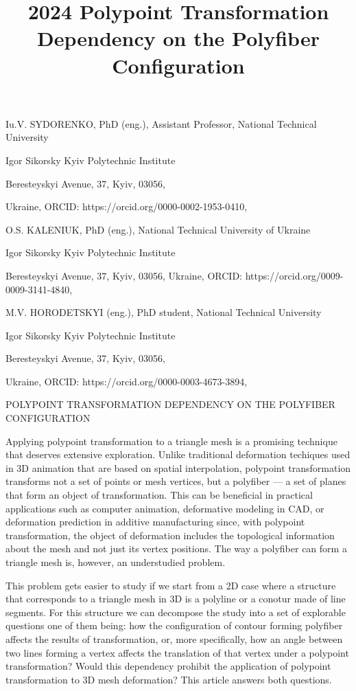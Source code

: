 \documentclass[12pt,a4paper]{article}
\begin{document}
\title{2024 Polypoint Transformation Dependency on the Polyfiber Configuration}
\maketitle
Iu.V. SYDORENKO, PhD (eng.), Assistant Professor, National Technical University
\par
Igor Sikorsky Kyiv Polytechnic Institute
\par
Beresteyskyi Avenue, 37, Kyiv, 03056,
\par
Ukraine, ORCID: https://orcid.org/0000-0002-1953-0410,
\par
O.S. KALENIUK, PhD (eng.), National Technical University of Ukraine
\par
Igor Sikorsky Kyiv Polytechnic Institute
\par
Beresteyskyi Avenue, 37, Kyiv, 03056, Ukraine, ORCID: https://orcid.org/0009-0009-3141-4840,
\par
M.V. HORODETSKYI (eng.), PhD student, National Technical University
\par
Igor Sikorsky Kyiv Polytechnic Institute
\par
Beresteyskyi Avenue, 37, Kyiv, 03056,
\par
Ukraine, ORCID: https://orcid.org/0000-0003-4673-3894,
\par
POLYPOINT TRANSFORMATION DEPENDENCY ON THE POLYFIBER CONFIGURATION
\par
Applying polypoint transformation to a triangle mesh is a promising technique that deserves extensive exploration. Unlike traditional deformation techiques used in 3D animation that are based on spatial interpolation, polypoint transformation transforms not a set of points or mesh vertices, but a polyfiber — a set of planes that form an object of transformation. This can be beneficial in practical applications such as computer animation, deformative modeling in CAD, or deformation prediction in additive manufacturing since, with polypoint transformation, the object of deformation includes the topological information about the mesh and not just its vertex positions. The way a polyfiber can form a triangle mesh is, however, an understudied problem.
\par
This problem gets easier to study if we start from a 2D case where a structure that corresponds to a triangle mesh in 3D is a polyline or a conotur made of line segments. For this structure we can decompose the study into a set of explorable questions one of them being: how the configuration of contour forming polyfiber affects the results of transformation, or, more specifically, how an angle between two lines forming a vertex affects the translation of that vertex under a polypoint transformation? Would this dependency prohibit the application of polypoint transformation to 3D mesh deformation? This article answers both questions.
\end{document}
